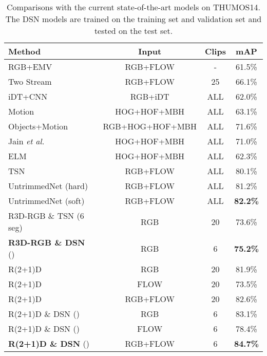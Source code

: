 \documentclass[journal]{IEEEtran}
\begin{document}
\begin{table*}[t]
\centering
\caption{Comparisons with the current state-of-the-art models on THUMOS14. The DSN models are trained on the training set and validation set and tested on the test set.}
\begin{tabular}{l|c|c|c}
\toprule[2pt]
Method &Input &Clips& mAP \\
\hline
RGB+EMV~\cite{ZhangWW0W16}&RGB+FLOW&-& 61.5\%\\
Two Stream~\cite{SimonyanZ14}&RGB+FLOW&25& 66.1\%\\
iDT+CNN~\cite{wang2014action}&RGB+iDT&ALL&62.0\%\\
Motion~\cite{JainGS15} &HOG+HOF+MBH&ALL& 63.1\% \\
Objects+Motion~\cite{JainGS15} &RGB+HOG+HOF+MBH&ALL& 71.6\% \\
Jain \emph{et al.}~\cite{jain2014university}&HOG+HOF+MBH&ALL& 71.0\% \\
ELM~\cite{varol2014extreme} &HOG+HOF+MBH&ALL& 62.3\%\\
TSN~\cite{TSN-J}&RGB+FLOW&ALL& 80.1\%\\
UntrimmedNet (hard)~\cite{WangXLG17}  &RGB+FLOW&ALL& 81.2\%\\
UntrimmedNet (soft)~\cite{WangXLG17} &RGB+FLOW&ALL&\textbf{82.2\%}\\
\hline
R3D-RGB \& TSN (6 seg)~ &RGB& 20 & 73.6\%\\
\textbf{R3D-RGB \& DSN} ()~ &RGB& 6&\textbf{75.2\%} \\
\hline
R(2+1)D&RGB&20& 81.9\%\\
R(2+1)D&FLOW&20& 73.5\%\\
R(2+1)D&RGB+FLOW&20& 82.6\%\\
R(2+1)D \& DSN ()~ &RGB&6& 83.1\% \\
R(2+1)D \& DSN ()~ &FLOW&6& 78.4\% \\
\textbf{R(2+1)D \& DSN} ()~ &RGB+FLOW&6& \textbf{84.7\%} \\

\bottomrule[2pt]
\end{tabular}
\label{tab:state_of_the_art_thumos}
\end{table*}
\end{document}
